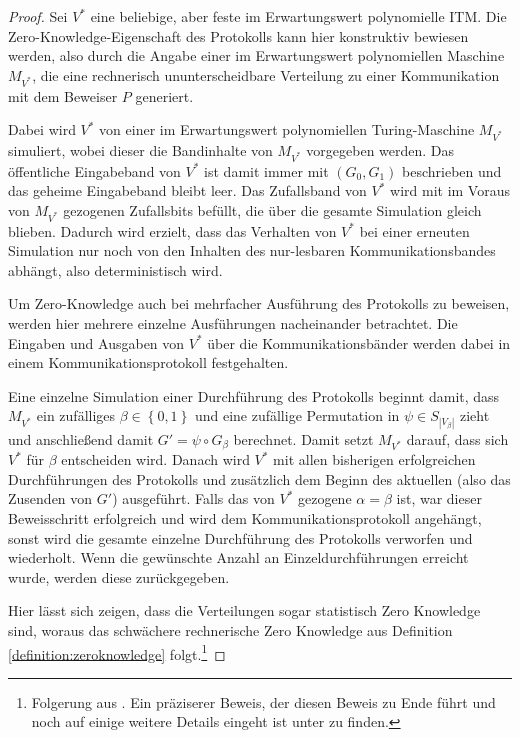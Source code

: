 \begin{proof}
\label{proof:zeroisomorphism}
Sei \( V^{\ast} \) eine beliebige, aber feste im Erwartungswert polynomielle ITM. Die Zero-Knowledge-Eigenschaft des Protokolls kann hier konstruktiv bewiesen werden, also durch die Angabe einer im Erwartungswert polynomiellen Maschine \( M_{V^{\ast}} \), die eine rechnerisch ununterscheidbare Verteilung zu einer Kommunikation mit dem Beweiser \( P \) generiert.

Dabei wird \( V^{\ast} \) von einer im Erwartungswert polynomiellen Turing-Maschine \( M_{V^{\ast}} \) simuliert, wobei dieser die Bandinhalte von 
\( M_{V^{\ast}} \) vorgegeben werden.
Das öffentliche Eingabeband von \( V^{\ast} \) ist damit immer mit \( \left( G_0, G_1 \right) \) beschrieben und das geheime Eingabeband bleibt leer. Das Zufallsband von \( V^{\ast} \) wird mit im Voraus von \( M_{V^{\ast}} \) gezogenen Zufallsbits befüllt, die über die gesamte Simulation gleich blieben. Dadurch wird erzielt, dass das Verhalten von \( V^{\ast} \) bei einer erneuten Simulation nur noch von den Inhalten des nur-lesbaren Kommunikationsbandes abhängt, also deterministisch wird.

Um Zero-Knowledge auch bei mehrfacher Ausführung des Protokolls zu beweisen, werden hier mehrere einzelne Ausführungen nacheinander betrachtet. Die Eingaben und Ausgaben von \( V^{\ast} \) über die Kommunikationsbänder werden dabei in einem Kommunikationsprotokoll festgehalten.

Eine einzelne Simulation einer Durchführung des Protokolls beginnt damit, dass \( M_{V^{\ast}} \) ein zufälliges \( \beta \in \left\lbrace 0, 1 \right\rbrace \) und eine zufällige Permutation in \( \psi \in S_{ \left| V_\beta \right| } \) zieht und anschließend damit \( G' = \psi \circ G_\beta \) berechnet. Damit \glqq{}setzt\grqq{} \( M_{V^{\ast}} \) darauf, dass sich \( V^{\ast} \) für \( \beta \) entscheiden wird. Danach wird \( V^{\ast} \) mit allen bisherigen erfolgreichen Durchführungen des Protokolls und zusätzlich dem Beginn des aktuellen (also das Zusenden von \( G' \)) ausgeführt. Falls das von \( V^{\ast} \) gezogene \( \alpha = \beta \) ist, war dieser Beweisschritt erfolgreich und wird dem Kommunikationsprotokoll angehängt, sonst wird die gesamte einzelne Durchführung des Protokolls verworfen und wiederholt. Wenn die gewünschte Anzahl an Einzeldurchführungen erreicht wurde, werden diese zurückgegeben.

Hier lässt sich zeigen, dass die Verteilungen sogar statistisch Zero Knowledge sind, woraus das schwächere rechnerische Zero Knowledge aus Definition \ref{definition:zeroknowledge} folgt.\footnote{Folgerung aus \cite[Seite 193]{identity}. Ein präziserer Beweis, der diesen Beweis zu Ende führt und noch auf einige weitere Details eingeht ist unter \cite[Theorem 2]{np} zu finden.}
\end{proof}

